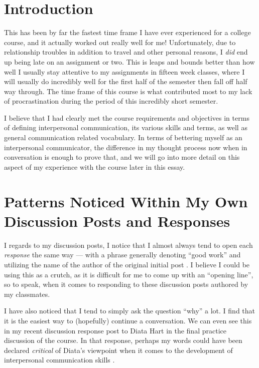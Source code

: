 
\section{Introduction}
  This has been by far the fastest time frame I have ever experienced for a
    college course, and it actually worked out really well for me!
    Unfortunately, due to relationship troubles in addition to travel and other
    personal reasons, I \textit{did} end up being late on an assignment or two.
    This is leaps and bounds better than how well I usually stay attentive
    to my assignments in fifteen week classes, where I will usually do
    incredibly well for the first half of the semester then fall off half way
    through. The time frame of this course is what contributed most to my
    lack of procrastination during the period of this incredibly short semester.

  I believe that I had clearly met the course requirements and objectives in
    terms of defining interpersonal communication, its various skills and terms,
    as well as general communication related vocabulary. In terms of bettering
    myself as an interpersonal communicator, the difference in my thought
    process now when in conversation is enough to prove that, and we will go
    into more detail on this aspect of my experience with the course later in
    this essay.


\section{Patterns Noticed Within My Own Discussion Posts and Responses}
  I regards to my discussion posts, I notice that I almost always tend to open
    each \textit{response} the same way --- with a phrase generally denoting
    ``good work'' and utilizing the name of the author of the original initial
    post \parencite{%
    hellwig_julayne_2020,hellwig_cherylee_2020,hellwig_kristyna_2020%
    }. I believe I could be using this as a crutch, as it is difficult for me
    to come up with an ``opening line'', so to speak, when it comes to
    responding to these discussion posts authored by my classmates.

  I have also noticed that I tend to simply ask the question ``why'' a lot.
    I find that it is the easiest way to (hopefully) continue a conversation.
    We can even see this in my recent discussion response post to Diata Hart
    in the final practice discussion of the course. In that response, perhaps
    my words could have been declared \textit{critical} of Diata's viewpoint
    when it comes to the development of interpersonal communication skills
    \parencite{hellwig_diata_2020}.


